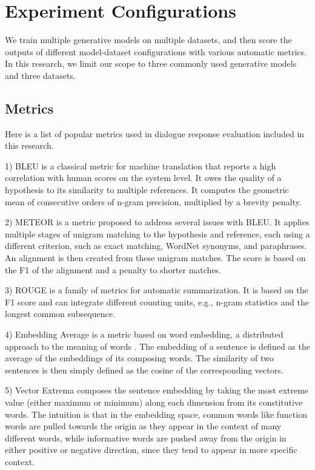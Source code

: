 \documentclass[conference]{IEEEtran}
\begin{document}
\section{Experiment Configurations}
We train multiple generative models on multiple datasets, and then score the outputs of different model-dataset configurations with various automatic metrics.
In this research, we limit our scope to three commonly used generative models and three datasets.

\subsection{Metrics}
Here is a list of popular metrics used in dialogue response evaluation included in this research.

1) BLEU \cite{BLEU} is a classical metric for machine translation that reports a high correlation with human scores on the system level.
It owes the quality of a hypothesis to its similarity to multiple references.
It computes the geometric mean of consecutive orders of n-gram precision, multiplied by a brevity penalty.

2) METEOR \cite{METEOR} is a metric proposed to address several issues with BLEU.
It applies multiple stages of unigram matching to the hypothesis and reference, each using a different criterion, such as exact matching, WordNet synonyms, and paraphrases.
An alignment is then created from these unigram matches.
The score is based on the F1 of the alignment and a penalty to shorter matches.

3) ROUGE \cite{ROUGE} is a family of metrics for automatic summarization.
It is based on the F1 score and can integrate different counting units, e.g., n-gram statistics and the longest common subsequence.

4) Embedding Average is a metric based on word embedding, a distributed approach to the meaning of words \cite{word2vec}.
The embedding of a sentence is defined as the average of the embeddings of its composing words.
The similarity of two sentences is then simply defined as the cosine of the corresponding vectors.

5) Vector Extrema \cite{Vector_Extrema} composes the sentence embedding by taking the most extreme value (either maximum or minimum) along each dimension from its constitutive words.
The intuition is that in the embedding space, common words like function words are pulled towards the origin as they appear in the context of many different words, while informative words are pushed away from the origin in either positive or negative direction, since they tend to appear in more specific context.
\end{document}
